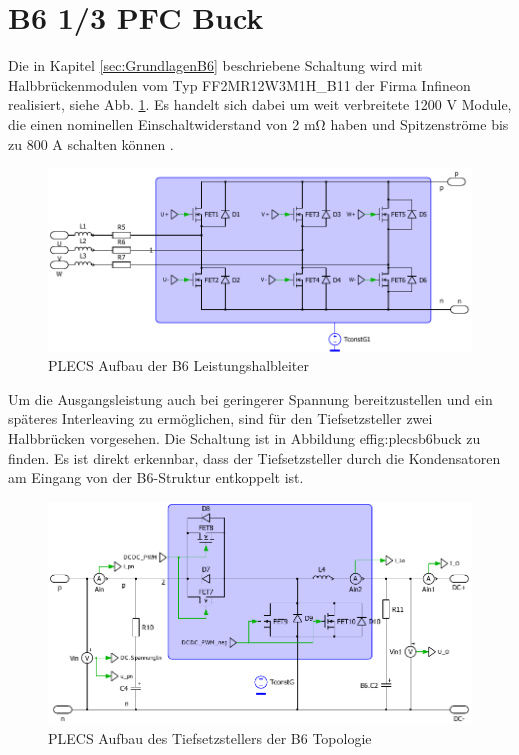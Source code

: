 \section{B6 1/3 PFC Buck}
Die in Kapitel \ref{sec:GrundlagenB6} beschriebene Schaltung wird mit Halbbrückenmodulen vom Typ FF2MR12W3M1H\_B11 der Firma Infineon realisiert, siehe Abb. \ref{fig:plecsb6}. Es handelt sich dabei um weit verbreitete 1200 \si{\volt} Module, die einen nominellen Einschaltwiderstand von 2 \si{\milli \ohm} haben und Spitzenströme bis zu 800 \si{\ampere} schalten können \cite{IFAGFF2}.
\begin{figure}[H]
	\centering
	\includegraphics[width=0.9\linewidth]{content/Grafiken/PLECS_B6}
	\caption{PLECS Aufbau der B6 Leistungshalbleiter}
	\label{fig:plecsb6}
\end{figure}
 Um die Ausgangsleistung auch bei geringerer Spannung bereitzustellen und ein späteres Interleaving zu ermöglichen, sind für den Tiefsetzsteller zwei Halbbrücken vorgesehen. Die Schaltung ist in Abbildung ef{fig:plecsb6buck} zu finden. Es ist direkt erkennbar, dass der Tiefsetzsteller durch die Kondensatoren am Eingang von der B6-Struktur entkoppelt ist.
 \begin{figure}[H]
 	\centering
 	\includegraphics[width=0.9\linewidth]{content/Grafiken/PLECS_B6Buck}
 	\caption{PLECS Aufbau des Tiefsetzstellers der B6 Topologie}
 	\label{fig:plecsb6buck}
 \end{figure}
 


